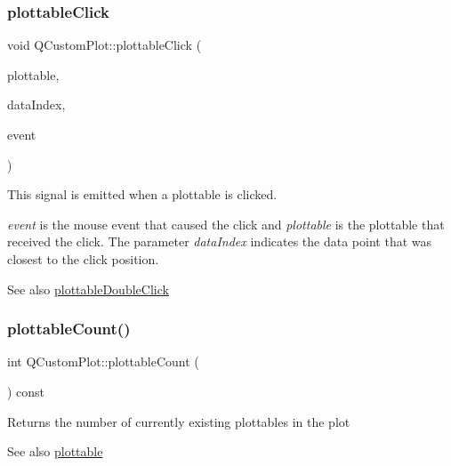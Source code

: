 \subsubsection{\texorpdfstring{plottable\+Click}{plottableClick}}
{\footnotesize\ttfamily void Q\+Custom\+Plot\+::plottable\+Click (\begin{DoxyParamCaption}\item[{\hyperlink{class_q_c_p_abstract_plottable}{Q\+C\+P\+Abstract\+Plottable} $\ast$}]{plottable,  }\item[{int}]{data\+Index,  }\item[{Q\+Mouse\+Event $\ast$}]{event }\end{DoxyParamCaption})\hspace{0.3cm}{\ttfamily [signal]}}

This signal is emitted when a plottable is clicked.

{\itshape event} is the mouse event that caused the click and {\itshape plottable} is the plottable that received the click. The parameter {\itshape data\+Index} indicates the data point that was closest to the click position.

\begin{DoxySeeAlso}{See also}
\hyperlink{class_q_custom_plot_a86a3ab7263c9c4e008e70d6c5fce9fbd}{plottable\+Double\+Click} 
\end{DoxySeeAlso}
\mbox{\label{class_q_custom_plot_a5f4f15991c14bf9ad659bb2a19dfbed4}} 
\subsubsection{\texorpdfstring{plottable\+Count()}{plottableCount()}}
{\footnotesize\ttfamily int Q\+Custom\+Plot\+::plottable\+Count (\begin{DoxyParamCaption}{ }\end{DoxyParamCaption}) const}

Returns the number of currently existing plottables in the plot

\begin{DoxySeeAlso}{See also}
\hyperlink{class_q_custom_plot_a32de81ff53e263e785b83b52ecd99d6f}{plottable} 
\end{DoxySeeAlso}
\mbox{\label{class_q_custom_plot_a86a3ab7263c9c4e008e70d6c5fce9fbd}} 
